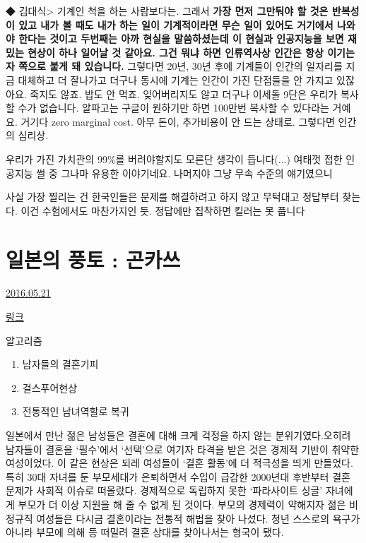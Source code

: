 ◆ 김대식> 기계인 척을 하는 사람보다는. 그래서 \textbf{가장 먼저 그만둬야 할 것은 반복성이 있고 내가 볼 때도 내가 하는 일이 기계적이라면 무슨 일이 있어도 거기에서 나와야 한다는 것이고 두번째는 아까 현실을 말씀하셨는데 이 현실과 인공지능을 보면 재밌는 현상이 하나 일어날 것 같아요. 그건 뭐냐 하면 인류역사상 인간은 항상 이기는 자 쪽으로 붙게 돼 있습니다.} 그렇다면 20년, 30년 후에 기계들이 인간의 일자리를 지금 대체하고 더 잘나가고 더구나 동시에 기계는 인간이 가진 단점들을 안 가지고 있잖아요. 죽지도 않죠. 밥도 안 먹죠. 잊어버리지도 않고 더구나 이세돌 9단은 우리가 복사할 수가 없습니다. 알파고는 구글이 원하기만 하면 100만번 복사할 수 있다라는 거예요. 거기다 zero marginal cost. 아무 돈이, 추가비용이 안 드는 상태로. 그렇다면 인간의 심리상.
\vspace{5mm}

우리가 가진 가치관의 99$\%$를 버려야할지도 모른단 생각이 듭니다(...)
여태껏 접한 인공지능 썰 중 그나마 유용한 이야기네요. 나머지야 그냥 무속 수준의 얘기였으니
\vspace{5mm}

사실 가장 찔리는 건 한국인들은 문제를 해결하려고 하지 않고 무턱대고 정답부터 찾는다.
이건 수험에서도 마찬가지인 듯. 정답에만 집착하면 킬러는 못 풉니다
\vspace{5mm}






\section{일본의 풍토 : 곤카쓰}
\href{https://www.kockoc.com/Apoc/785611}{2016.05.21}

\vspace{5mm}

\href{http://news.naver.com/main/read.nhn?mode=LSD&mid=shm&sid1=102&oid=469&aid=0000122058}{링크}
\vspace{5mm}

알고리즘
\vspace{5mm}
\begin{enumerate}
    \item 남자들의 결혼기피
    \item 걸스푸어현상
    \item 전통적인 남녀역할로 복귀
\end{enumerate}
\vspace{5mm}

일본에서 만난 젊은 남성들은 결혼에 대해 크게 걱정을 하지 않는 분위기였다.오히려 남자들이 결혼을 ‘필수’에서 ‘선택’으로 여기자 타격을 받은 것은 경제적 기반이 취약한 여성이었다. 이 같은 현상은 되레 여성들이 ‘결혼 활동’에 더 적극성을 띄게 만들었다.
특히 30대 자녀를 둔 부모세대가 은퇴하면서 수입이 급감한 2000년대 후반부터 결혼 문제가 사회적 이슈로 떠올랐다. 경제적으로 독립하지 못한 ‘파라사이트 싱글’ 자녀에게 부모가 더 이상 지원을 해 줄 수 없게 된 것이다. 부모의 경제력이 약해지자 젊은 비정규직 여성들은 다시금 결혼이라는 전통적 해법을 찾아 나섰다. 청년 스스로의 욕구가 아니라 부모에 의해 등 떠밀려 결혼 상대를 찾아나서는 형국이 됐다.
\vspace{5mm}

